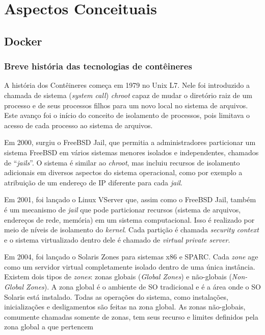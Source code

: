 \documentclass[]{politex}
\begin{document}
\chapter{Aspectos Conceituais}
	\section{Docker}
	\subsection{Breve história das tecnologias de contêineres}
	A história dos Contêineres começa em 1979 no Unix L7. Nele foi introduzido a chamada de sistema (\textit{system call}) \textit{chroot} capaz de mudar o diretório raiz de um processo e de seus processos filhos para um novo local no sistema de arquivos. Este avanço foi o início do conceito de isolamento de processos, pois limitava o acesso de cada processo ao sistema de arquivos. 

	Em 2000, surgiu o FreeBSD Jail, que permitia a administradores particionar um sistema FreeBSD em vários sistemas menores isolados e independentes, chamados de “\textit{jails}”. O sistema é similar ao \textit{chroot}, mas incluiu recursos de isolamento adicionais em diversos aspectos do sistema operacional, como por exemplo a atribuição de um endereço de IP diferente para cada \textit{jail}. \cite{abriefhistoryofcontainers}

	Em 2001, foi lançado o Linux VServer que, assim como o FreeBSD Jail, também é um mecanismo de \textit{jail} que pode particionar recursos (sistema de arquivos, endereços de rede, memória) em um sistema computacional. Isso é realizado por meio de níveis de isolamento do \textit{kernel}. Cada partição é chamada \textit{security context} e o sistema virtualizado dentro dele é chamado de \textit{virtual private server}. \cite{linuxvserver}

	Em 2004, foi lançado o Solaris Zones para sistemas x86 e SPARC. Cada \textit{zone} age como um servidor virtual completamente isolado dentro de uma única instância. Existem dois tipos de \textit{zones}: zonas globais (\textit{Global Zones}) e não-globais (\textit{Non-Global Zones}). A zona global é o ambiente de SO tradicional e é a área onde o SO Solaris está instalado. Todas as operações do sistema, como instalações, inicializações e desligamentos são feitas na zona global. As zonas não-globais, comumente chamadas somente de zonas, tem seus recurso e limites definidos pela zona global a que pertencem  \cite{introductiontosolariszone}
\end{document}
